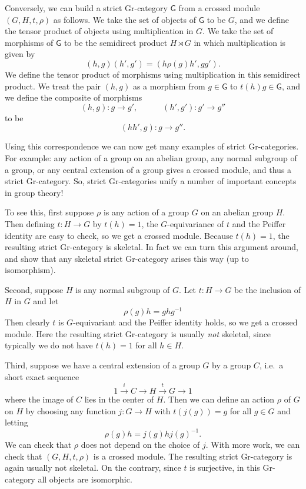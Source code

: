 \documentclass[reqno]{amsart}
\newcommand{\maps}{\colon}    %
\newcommand{\G}{{\mathsf{G}}}   %
\theoremstyle{definition}
\begin{document}
Conversely, we can build a strict Gr-category $\G$ from a crossed module $(G,H,t,\rho)$ as follows.   We take the set of objects of $\G$ to be $G$, and we define the tensor product of objects using multiplication in $G$.  We take the set of morphisms of $\G$ to be the semidirect product $H \rtimes G$ in which multiplication is given by
\[    (h,g) (h',g') = (h \rho(g)h', gg') .\]
We define the tensor product of morphisms using multiplication in this semidirect product.   We treat the pair $(h,g)$ as a morphism from $g \in \G$ to $t(h) g \in \G$, and we define the composite of morphisms
\[  (h,g) \maps g  \to g'  , \qquad \quad
(h',g') \maps g' \to g'' \] 
to be
\[   (hh',g) \maps g \to g'' .\]

Using this correspondence we can now get many examples of strict Gr-categories.   For example: any action of a group on an abelian group, any normal subgroup of a group, or any central extension of a group gives a crossed module, and thus a strict Gr-category.   So, strict Gr-categories unify a number of important concepts in group theory!

To see this, first suppose $\rho$ is any action of a group $G$ on an abelian group $H$. Then defining $t \maps H \to G$ by $t(h) = 1$, the $G$-equivariance of $t$ and the Peiffer identity are easy to check, so we get a crossed module.  Because $t(h) = 1$, the resulting strict Gr-category is skeletal.  In fact we can turn this argument around, and show that any skeletal strict Gr-category arises this way (up to isomorphism).   

Second, suppose $H$ is any normal subgroup of $G$.  Let
$t \maps H \to G$ be the inclusion of $H$ in $G$ and let 
\[   \rho(g) h = g h g^{-1}  \]
Then clearly $t$ is $G$-equivariant and the Peiffer identity holds, so
we get a crossed module.  Here the resulting strict Gr-category is usually
\emph{not} skeletal, since typically we do not have $t(h) = 1$ for all
$h \in H$.

Third, suppose we have a central extension of a group $G$ by a group
$C$, i.e.\ a short exact sequence
\[       1 \xrightarrow{\; i \; } C \xrightarrow{\phantom{\; i \; }} H \xrightarrow{\; t \; } G \xrightarrow{\phantom{\; t \; }} 1 \]
where the image of $C$ lies in the center of $H$.   Then we can define
an action $\rho$ of $G$ on $H$ by choosing any function $j \maps
G \to H$ with $t (j(g)) = g$ for all $g \in G$ and letting
\[            \rho(g) h = j(g) h j(g)^{-1}   .\]
We can check that $\rho$ does not depend on the choice of $j$.   
With more work, we can check that $(G,H,t,\rho)$ is a crossed module.
The resulting strict Gr-category is again usually not skeletal.  On the contrary, since $t$ is surjective, in this Gr-category all objects are isomorphic.
\end{document}
